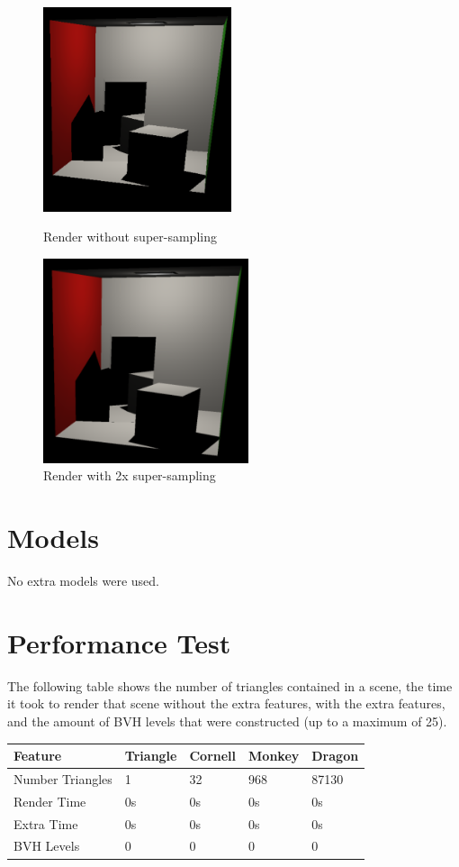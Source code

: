 \documentclass{article}
\begin{document}
    \begin{figure}[!htb]
          \includegraphics[width=\linewidth, height=6cm]{images/supersampling_non_supersampled}
          \caption*{Render without super-sampling}
        \endminipage\hfill
          \includegraphics[width=\linewidth, height=6cm]{images/supersampling_supersampled}
          \caption*{Render with 2x super-sampling}
        \endminipage
    \end{figure}

    \section{Models}
    No extra models were used.

    \section{Performance Test}
    The following table shows the number of triangles contained in a scene, the time it took to render that 
    scene without the extra features, with the extra features, and the amount of BVH levels that were 
    constructed (up to a maximum of 25).

    \begin{tabular}{ |p{2.8cm}||p{1.5cm}|p{1.5cm}|p{1.5cm}|p{1.5cm}| }
      \hline
      \textbf{Feature} &\textbf{Triangle} &\textbf{Cornell} &\textbf{Monkey} &\textbf{Dragon}\\
      \hline
      Number Triangles  &1      &32     &968    &87130\\
      Render Time       &0s     &0s     &0s     &0s\\
      Extra Time        &0s     &0s     &0s     &0s\\
      BVH Levels        &0      &0      &0      &0\\
      \hline
  \end{tabular}
\end{document}
